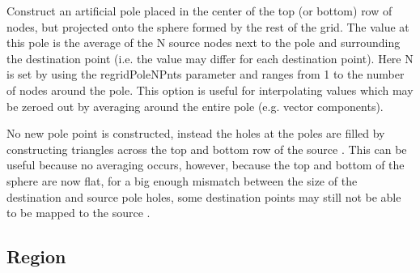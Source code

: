 \documentclass[letterpaper,10pt,english]{sphinxmanual}
\begin{document}
\begin{fulllineitems}
\begin{fulllineitems}
\end{fulllineitems}


\begin{fulllineitems}
\label{\detokenize{PoleMethod:ESMF.api.constants.PoleMethod.NPNTAVG}}
Construct an artificial pole placed in the center of the top (or bottom)
row of nodes, but projected onto the sphere formed by the rest of the grid.
The value at this pole is the average of the N source nodes next to the pole
and surrounding the destination point (i.e. the value may differ for each
destination point). Here N is set by using the regridPoleNPnts parameter
and ranges from 1 to the number of nodes around the pole. This option is
useful for interpolating values which may be zeroed out by averaging around
the entire pole (e.g. vector components).

\end{fulllineitems}


\begin{fulllineitems}
\label{\detokenize{PoleMethod:ESMF.api.constants.PoleMethod.TEETH}}
No new pole point is constructed, instead the holes at the poles are filled
by constructing triangles across the top and bottom row of the source {\hyperref[\detokenize{grid:ESMF.api.grid.Grid}]{}}.
This can be useful because no averaging occurs, however, because the top and
bottom of the sphere are now flat, for a big enough mismatch between the
size of the destination and source pole holes, some destination points may
still not be able to be mapped to the source {\hyperref[\detokenize{grid:ESMF.api.grid.Grid}]{}}.

\end{fulllineitems}


\end{fulllineitems}



\subsection{Region}
\label{\detokenize{Region:region}}\label{\detokenize{Region::doc}}
\end{document}
